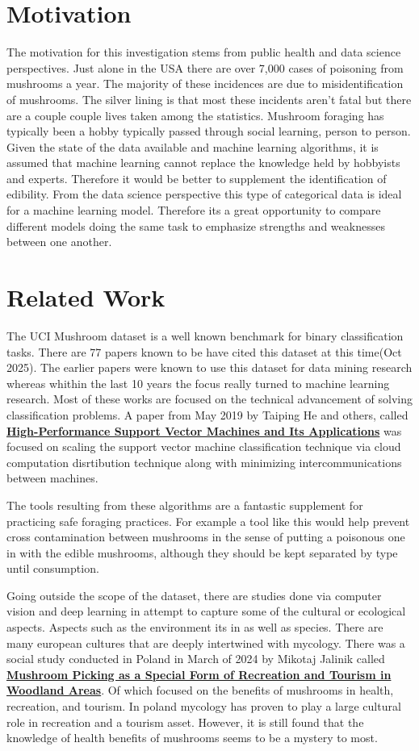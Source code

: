 \documentclass[conference]{IEEEtran}
\begin{document}
\section{Motivation}
    The motivation for this investigation stems from public health and data science perspectives. Just alone in the USA there are over 7,000 cases of poisoning from mushrooms a year. The majority of these incidences are due to misidentification of mushrooms. The silver lining is that most these incidents aren't fatal but there are a couple couple lives taken among the statistics. Mushroom foraging has typically been a hobby typically passed through social learning, person to person. Given the state of the data available and machine learning algorithms, it is assumed that machine learning cannot replace the knowledge held by hobbyists and experts. Therefore it would be better to supplement the identification of edibility. From the data science perspective this type of categorical data is ideal for a machine learning model. Therefore its a great opportunity to compare different models doing the same task to emphasize strengths and weaknesses between one another.

\section{Related Work}
    The UCI Mushroom dataset is a well known benchmark for binary classification tasks. There are 77 papers known to be have cited this dataset at this time(Oct 2025). The earlier papers were known to use this dataset for data mining research whereas whithin the last 10 years the focus really turned to machine learning research. Most of these works are focused on the technical advancement of solving classification problems. A paper from May 2019 by Taiping He and others, called \textbf{\uline{High-Performance Support Vector Machines and Its Applications}} was focused on scaling the support vector machine classification technique via cloud computation disrtibution technique along with minimizing intercommunications between machines. 

    The tools resulting from these algorithms are a fantastic supplement for practicing safe foraging practices. For example a tool like this would help prevent cross contamination between mushrooms in the sense of putting a poisonous one in with the edible mushrooms, although they should be kept separated by type until consumption.
    
    Going outside the scope of the dataset, there are studies done via computer vision and deep learning in attempt to capture some of the cultural or ecological aspects. Aspects such as the environment its in as well as species. There are many european cultures that are deeply intertwined with mycology. There was a social study conducted in Poland in March of 2024 by Mikotaj Jalinik called \textbf{\uline{Mushroom Picking as a Special Form of Recreation and Tourism in Woodland Areas}}. Of which focused on the benefits of mushrooms in health, recreation, and tourism. In poland mycology has proven to play a large cultural role in recreation and a tourism asset. However, it is still found that the knowledge of health benefits of mushrooms seems to be a mystery to most.
\end{document}
